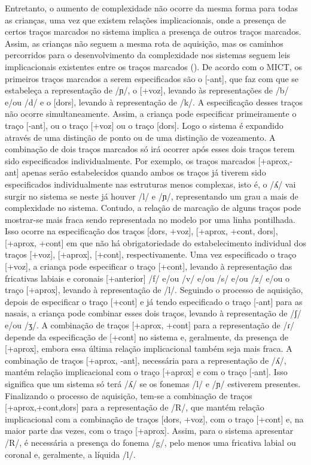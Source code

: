 \documentclass[output=paper,colorlinks,citecolor=brown,booklanguage=portuguese]{langscibook}
\begin{document}
Entretanto, o aumento de complexidade não ocorre da mesma forma para todas as crianças, uma vez que existem relações implicacionais, onde a presença de certos traços marcados no sistema implica a presença de outros traços marcados. Assim, as crianças não seguem a mesma rota de aquisição, mas os caminhos percorridos para o desenvolvimento da complexidade nos sistemas seguem leis implicacionais existentes entre os traços marcados (\citeauthor[op. cit]{Mota1996}). De acordo com o MICT, os primeiros traços marcados a serem especificados são o [-ant], que faz com que se estabeleça a representação de /ɲ/, o [+voz], levando às representações de /b/ e/ou /d/ e o [dors], levando à representação de /k/. A especificação desses traços não ocorre simultaneamente. Assim, a criança pode especificar primeiramente o traço [-ant], ou o traço [+voz] ou o traço [dors]. Logo o sistema é expandido através de uma distinção de ponto ou de uma distinção de vozeamento. A combinação de dois traços marcados só irá ocorrer após esses dois traços terem sido especificados individualmente. Por exemplo, os traços marcados [+aprox,-ant] apenas serão estabelecidos quando ambos os traços já tiverem sido especificados individualmente nas estruturas menos complexas, isto é, o /ʎ/ vai surgir no sistema se neste já houver /l/ e /ɲ/, representando um grau a mais de complexidade no sistema. Contudo, a relação de marcação de alguns traços pode mostrar-se mais fraca sendo representada no modelo por uma linha pontilhada. Isso ocorre na especificação dos traços [dors, +voz], [+aprox, +cont, dors], [+aprox, +cont] em que não há obrigatoriedade do estabelecimento individual dos traços [+voz], [+aprox], [+cont], respectivamente. Uma vez especificado o traço [+voz], a criança pode especificar o traço [+cont], levando à representação das fricativas labiais e coronais [+anterior] /f/ e/ou /v/ e/ou /s/ e/ou /z/ e/ou o traço [+aprox], levando à representação de /l/. Seguindo o processo de aquisição, depois de especificar o traço [+cont] e já tendo especificado o traço [-ant] para as nasais, a criança pode combinar esses dois traços, levando à representação de /ʃ/ e/ou /ʒ/. A combinação de traços [+aprox, +cont] para a representação de /ɾ/ depende da especificação de [+cont] no sistema e, geralmente, da presença de [+aprox], embora essa última relação implicacional também seja mais fraca. A combinação de traços [+aprox, -ant], necessária para a representação de /ʎ/, mantém relação implicacional com o traço [+aprox] e com o traço [-ant]. Isso significa que um sistema só terá /ʎ/ se os fonemas /l/ e /ɲ/ estiverem presentes.  Finalizando o processo de aquisição, tem-se a combinação de traços [+aprox,+cont,dors] para a representação de /R/, que mantém relação implicacional com a combinação de traços [dors, +voz], com o traço [+cont] e, na maior parte das vezes, com o traço [+aprox]. Assim, para o sistema apresentar /R/, é necessária a presença do fonema /g/, pelo menos uma fricativa labial ou coronal e, geralmente, a líquida /l/. 
\end{document}
